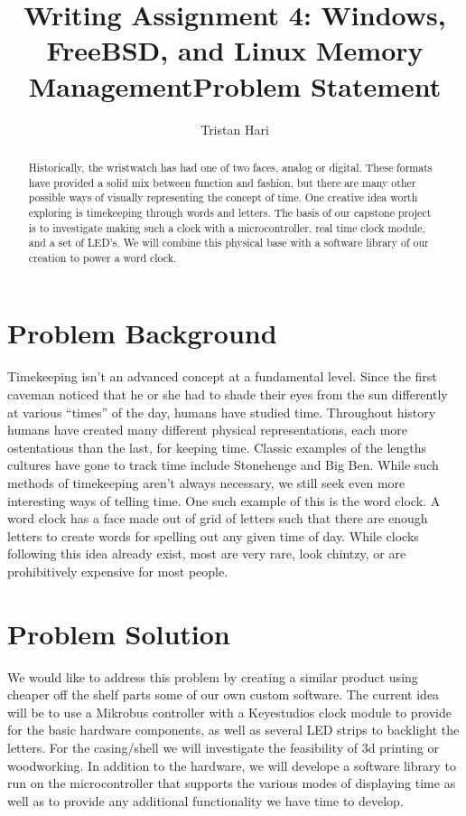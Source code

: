 \documentclass[10pt,draftclsnofoot,onecolumn]{IEEEtran}
\begin{document}
\title{Writing Assignment 4: Windows, FreeBSD, and Linux Memory Management}
\author{Tristan Hari}
\maketitle
\begin{abstract}
Historically, the wristwatch has had one of two faces, analog or digital. These
formats have provided a solid mix between function and fashion, but there are
many other possible ways of visually representing the concept of time. One
creative idea worth exploring is timekeeping through words and letters. The
basis of our capstone project is to investigate making such a clock with a
microcontroller, real time clock module, and a set of LED’s. We will combine
this physical base with a software library of our creation to power a word clock.
\end{abstract}
\IEEEpeerreviewmaketitle

\newpage
{}

\title{Problem Statement}
\section{Problem Background}
Timekeeping isn’t an advanced concept at a fundamental level. Since the first
caveman noticed that he or she had to shade their eyes from the sun differently
at various “times” of the day, humans have studied time. Throughout history
humans have created many different physical representations, each more
ostentatious than the last, for keeping time. Classic examples of the lengths
cultures have gone to track time include Stonehenge and Big Ben. While such
methods of timekeeping aren’t always necessary, we still seek even more
interesting ways of telling time. One such example of this is the word clock. A
word clock has a face made out of grid of letters such that there are enough
letters to create words for spelling out any given time of day. While clocks
following this idea already exist, most are very rare, look chintzy, or are
prohibitively expensive for most people.

\section{Problem Solution}
We would like to address this problem by creating a similar product using
cheaper off the shelf parts some of our own custom software. The current idea
will be to use a Mikrobus controller with a Keyestudios clock module to provide
for the basic hardware components, as well as several LED strips to backlight
the letters. For the casing/shell we will investigate the feasibility of 3d
printing or woodworking. In addition to the hardware, we will develope a
software library to run on the microcontroller that supports the various modes
of displaying time as well as to provide any additional functionality we have
time to develop.
\end{document}
